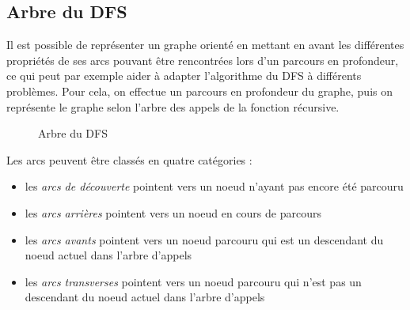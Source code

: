 \documentclass[11pt,a4paper]{article}
\begin{document}
  \subsection{Arbre du DFS}
Il est possible de représenter un graphe orienté en mettant en avant les différentes propriétés de ses arcs pouvant être rencontrées lors d'un parcours en profondeur, ce qui peut par exemple aider à adapter l'algorithme du DFS à différents problèmes.
Pour cela, on effectue un parcours en profondeur du graphe, puis on représente le graphe selon l'arbre des appels de la fonction récursive.

\begin{figure}[h]
  \label{arbre-dfs}
  \centering
  \caption{Arbre du DFS}
  \vspace{2mm}
\end{figure}

Les arcs peuvent être classés en quatre catégories :
\begin{itemize}
  \item[\LARGE\textbf\textrightarrow] les \textit{arcs de découverte} pointent vers un noeud n'ayant pas encore été parcouru
  \item[\color{red} \LARGE\textbf\textrightarrow] les \textit{arcs arrières} pointent vers un noeud en cours de parcours
  \item[\color{green} \LARGE\textbf\textrightarrow] les \textit{arcs avants} pointent vers un noeud parcouru qui est un descendant du noeud actuel dans l'arbre d'appels
  \item[\color{blue} \LARGE\textbf\textrightarrow] les \textit{arcs transverses} pointent vers un noeud parcouru qui n'est pas un descendant du noeud actuel dans l'arbre d'appels
\end{itemize}
\end{document}
